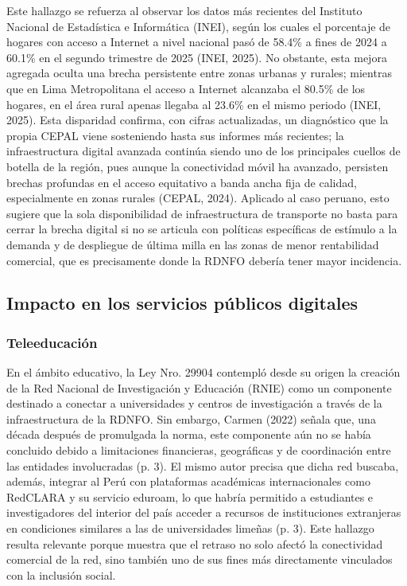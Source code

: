 Este hallazgo se refuerza al observar los datos más recientes del Instituto Nacional de Estadística e Informática (INEI), según los cuales el porcentaje de hogares con acceso a Internet a nivel nacional pasó de 58.4\% a fines de 2024 a 60.1\% en el segundo trimestre de 2025 (INEI, 2025). No obstante, esta mejora agregada oculta una brecha persistente entre zonas urbanas y rurales; mientras que en Lima Metropolitana el acceso a Internet alcanzaba el 80.5\% de los hogares, en el área rural apenas llegaba al 23.6\% en el mismo periodo (INEI, 2025). Esta disparidad confirma, con cifras actualizadas, un diagnóstico que la propia CEPAL viene sosteniendo hasta sus informes más recientes; la infraestructura digital avanzada continúa siendo uno de los principales cuellos de botella de la región, pues aunque la conectividad móvil ha avanzado, persisten brechas profundas en el acceso equitativo a banda ancha fija de calidad, especialmente en zonas rurales (CEPAL, 2024). Aplicado al caso peruano, esto sugiere que la sola disponibilidad de infraestructura de transporte no basta para cerrar la brecha digital si no se articula con políticas específicas de estímulo a la demanda y de despliegue de última milla en las zonas de menor rentabilidad comercial, que es precisamente donde la RDNFO debería tener mayor incidencia.

\subsection{Impacto en los servicios públicos digitales}
\subsubsection{Teleeducación}
En el ámbito educativo, la Ley Nro. 29904 contempló desde su origen la creación de la Red Nacional de Investigación y Educación (RNIE) como un componente destinado a conectar a universidades y centros de investigación a través de la infraestructura de la RDNFO. Sin embargo, Carmen (2022) señala que, una década después de promulgada la norma, este componente aún no se había concluido debido a limitaciones financieras, geográficas y de coordinación entre las entidades involucradas (p. 3). El mismo autor precisa que dicha red buscaba, además, integrar al Perú con plataformas académicas internacionales como RedCLARA y su servicio eduroam, lo que habría permitido a estudiantes e investigadores del interior del país acceder a recursos de instituciones extranjeras en condiciones similares a las de universidades limeñas (p. 3). Este hallazgo resulta relevante porque muestra que el retraso no solo afectó la conectividad comercial de la red, sino también uno de sus fines más directamente vinculados con la inclusión social.

